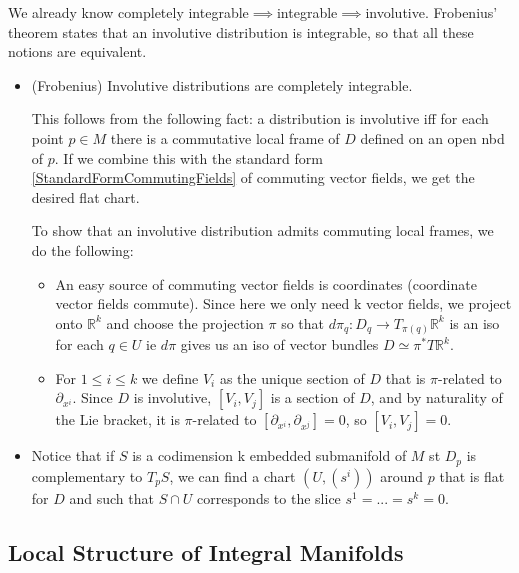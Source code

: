 \documentclass{report}
\theoremstyle{definition}
\begin{document}
We already know completely integrable$\implies$integrable$\implies$involutive. Frobenius' theorem states that an involutive distribution is integrable, so that all these notions are equivalent.
\begin{itemize}
    \item (Frobenius) Involutive distributions are completely integrable.

    This follows from the following fact: a distribution is involutive iff for each point $p\in M$ there is a commutative local frame of $D$ defined on an open nbd of $p$. If we combine this with the standard form \ref{StandardFormCommutingFields} of commuting vector fields, we get the desired flat chart.

    To show that an involutive distribution admits commuting local frames, we do the following:
    \begin{itemize}
        \item An easy source of commuting vector fields is coordinates (coordinate vector fields commute). Since here we only need k vector fields, we project onto $\mathbb{R}^k$ and choose the projection $\pi$ so that $d\pi_q:D_q\to T_{\pi(q)}\mathbb{R}^k$ is an iso for each $q\in U$ ie $d\pi$ gives us an iso of vector bundles $D\simeq \pi^*T\mathbb{R}^k$.
        \item For $1\leq i\leq k$ we define $V_i$ as the unique section of $D$ that is $\pi$-related to $\partial_{x^i}$. Since $D$ is involutive, $[V_i,V_j]$ is a section of $D$, and by naturality of the Lie bracket, it is $\pi$-related to $[\partial_{x^i},\partial_{x^j}]=0$, so $[V_i,V_j]=0$.
    \end{itemize}
    \item Notice that if $S$ is a codimension k embedded submanifold of $M$ st $D_p$ is complementary to $T_pS$, we can find a chart $(U,(s^i))$ around $p$ that is flat for $D$ and such that $S\cap U$ corresponds to the slice $s^1=...=s^k=0$.
\end{itemize}

\subsection{Local Structure of Integral Manifolds}
\end{document}
